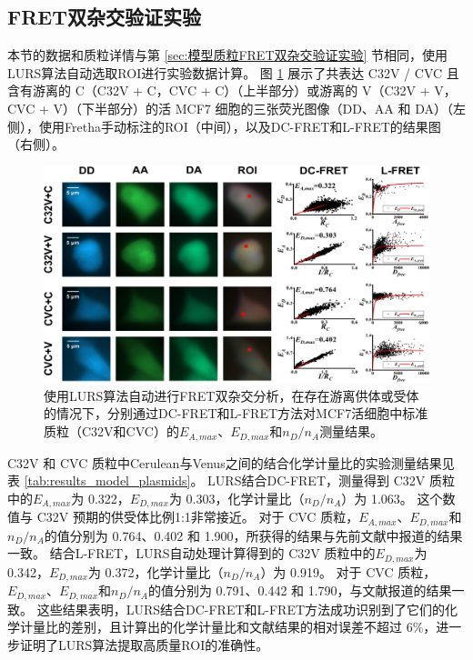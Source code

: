 \subsection{FRET双杂交验证实验}
本节的数据和质粒详情与第 \ref{sec:模型质粒FRET双杂交验证实验} 节相同，使用LURS算法自动选取ROI进行实验数据计算。
图 \ref{fig:results_model_plasmids} 展示了共表达 C32V / CVC 且含有游离的 C（C32V + C，CVC + C）（上半部分）或游离的 V（C32V + V，CVC + V）（下半部分）的活 MCF7 细胞的三张荧光图像（DD、AA 和 DA）（左侧），使用Fretha手动标注的ROI（中间），以及DC-FRET和L-FRET的结果图（右侧）。
\begin{figure}[htbp]
    \centering
    \includegraphics[width=1\linewidth]{../figures/4/LURS结果-模型质粒.drawio.png}
    \caption[LURS自动处理的C32V和CVC的FRET双杂交分析结果]{使用LURS算法自动进行FRET双杂交分析，在存在游离供体或受体的情况下，分别通过DC-FRET和L-FRET方法对MCF7活细胞中标准质粒（C32V和CVC）的$E_{A, max}$、$E_{D, max}$和$n_D/n_A$测量结果。}
    \label{fig:results_model_plasmids}
\end{figure}

C32V 和 CVC 质粒中Cerulean与Venus之间的结合化学计量比的实验测量结果见表 \ref{tab:results_model_plasmids}。
LURS结合DC-FRET，测量得到 C32V 质粒中的$E_{A,max}$为 0.322，$E_{D,max}$为 0.303，化学计量比（$n_D/n_A$）为 1.063。
这个数值与 C32V 预期的供受体比例1:1非常接近。
对于 CVC 质粒，$E_{A,max}$、$E_{D,max}$和$n_D/n_A$的值分别为 0.764、0.402 和 1.900，所获得的结果与先前文献中报道的结果一致。
结合L-FRET，LURS自动处理计算得到的 C32V 质粒中的$E_{D,max}$为 0.342，$E_{D,max}$为 0.372，化学计量比（$n_D/n_A$）为 0.919。
对于 CVC 质粒，$E_{D,max}$、$E_{D,max}$和$n_D/n_A$的值分别为 0.791、0.442 和 1.790，与文献报道的结果一致。
这些结果表明，LURS结合DC-FRET和L-FRET方法成功识别到了它们的化学计量比的差别，且计算出的化学计量比和文献结果的相对误差不超过 6\%，进一步证明了LURS算法提取高质量ROI的准确性。

